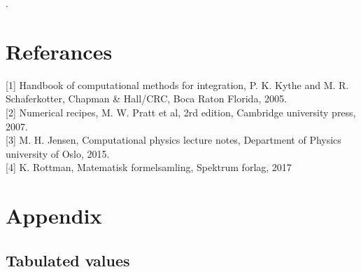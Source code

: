 \documentclass[%
reprint,nofootinbib,
amsmath,amssymb,
aps,
]{revtex4-1}
\begin{document}
\newpage. \newpage
\onecolumngrid
\section{Referances}
[1] Handbook of computational methods for integration, P. K. Kythe and M. R. Schaferkotter, Chapman \& Hall/CRC, Boca Raton Florida, 2005.\\

[2] Numerical recipes, M. W. Pratt et al, 2rd edition, Cambridge university press, 2007.\\  

[3] M. H. Jensen, Computational physics lecture notes, Department of Physics university of Oslo, 2015. \\

[4] K. Rottman, Matematisk formelsamling, Spektrum forlag, 2017
\newpage 
\section{Appendix}
\subsection{Tabulated values}
\end{document}

